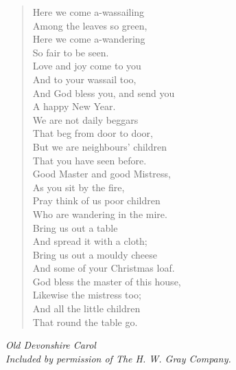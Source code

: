 
\begin{verse}
Here we come a-wassailing\\
\hspace*{2em}Among the leaves so green,\\
Here we come a-wandering\\
\hspace*{2em}So fair to be seen.\\[0.7em]

Love and joy come to you\\
\hspace*{2em}And to your wassail too,\\
And God bless you, and send you\\
\hspace*{2em}A happy New Year.\\[0.7em]

We are not daily beggars\\
\hspace*{2em}That beg from door to door,\\
But we are neighbours' children\\
\hspace*{2em}That you have seen before.\\[0.7em]

Good Master and good Mistress,\\
\hspace*{2em}As you sit by the fire,\\
Pray think of us poor children\\
\hspace*{2em}Who are wandering in the mire.\\[0.7em]

Bring us out a table\\
\hspace*{2em}And spread it with a cloth;\\
Bring us out a mouldy cheese\\
\hspace*{2em}And some of your Christmas loaf.\\[0.7em]

God bless the master of this house,\\
\hspace*{2em}Likewise the mistress too;\\
And all the little children\\
\hspace*{2em}That round the table go.%
\end{verse}

\vspace{0.5\baselineskip}
\noindent\textit{Old Devonshire Carol}\\
\noindent\textit{Included by permission of The H. W. Gray Company.}

\newpage
